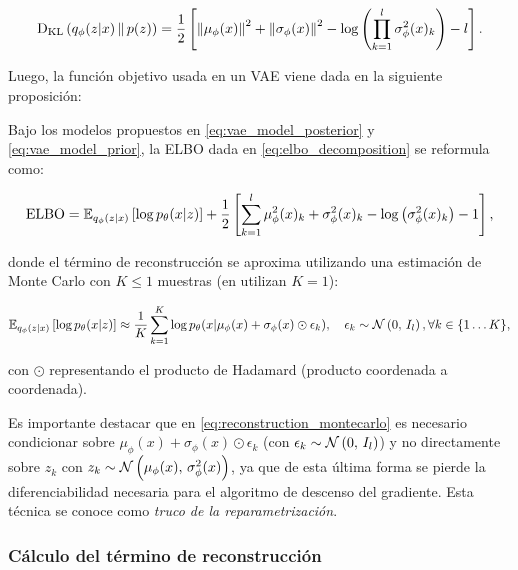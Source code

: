 \begin{equation*}
    \operatorname{D_{KL}}\left(q_\phi(z|x)\,\|\,p(z)\right)
    = \frac{1}{2}\left[
        \left\lVert \mu_\phi(x) \right\rVert^2 + \left\lVert \sigma_\phi(x) \right\rVert^2
        - \log\left(\prod_{k=1}^l \sigma_\phi^2(x)_k\right)-l\right].
\end{equation*}

Luego, la función objetivo usada en un VAE viene dada en la siguiente proposición:

\begin{prop}
    Bajo los modelos propuestos en \eqref{eq:vae_model_posterior} y \eqref{eq:vae_model_prior}, la ELBO dada en \eqref{eq:elbo_decomposition} se reformula como:

    \begin{equation}
        \label{eq:elbo_vae}
        \operatorname{ELBO}
        = \mathbb{E}_{q_\phi(z|x)}\left[\log p_\theta(x|z)\right] + \frac{1}{2}\left[
            \sum_{k=1}^l \mu_\phi^2(x)_k + \sigma_\phi^2(x)_k
            - \log\left(\sigma_\phi^2(x)_k\right) - 1\right],
    \end{equation}

    donde el término de reconstrucción se aproxima utilizando una estimación de Monte Carlo con $K\leq 1$ muestras (en \cite{kingma2022autoencoding} utilizan $K=1$):

    \begin{equation}
        \label{eq:reconstruction_montecarlo}
        \mathbb{E}_{q_\phi(z|x)}\left[\log p_\theta(x|z)\right]
        \approx \frac{1}{K}\sum_{k=1}^K \log p_\theta(x|\mu_\phi(x)+\sigma_\phi(x)\odot\epsilon_k),
        \quad
        \epsilon_k \sim \mathcal{N}\left(0,\,I_l\right), \forall k\in\{1\ldots K\},
    \end{equation}

    con $\odot$ representando el producto de Hadamard (producto coordenada a coordenada).
\end{prop}

Es importante destacar que en \eqref{eq:reconstruction_montecarlo} es necesario condicionar sobre $\mu_\phi(x)+\sigma_\phi(x)\odot\epsilon_k$ (con $\epsilon_k\sim\mathcal{N}\left(0,\,I_l\right)$) y no directamente sobre $z_k$ con $z_k\sim \mathcal{N}\left(\mu_\phi(x),\,\sigma^2_\phi(x)\right)$, ya que de esta última forma se pierde la diferenciabilidad necesaria para el algoritmo de descenso del gradiente. Esta técnica se conoce como \textit{truco de la reparametrización}.

\subsubsection{Cálculo del término de reconstrucción}

